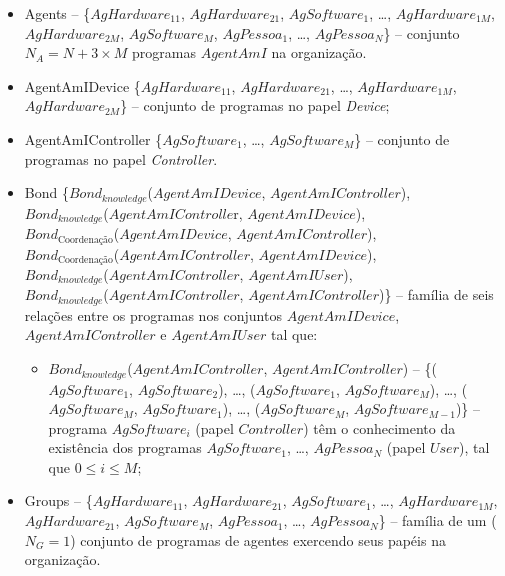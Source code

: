 \begin{itemize}
    \item Agents -- \{$AgHardware_{11}$, $AgHardware_{21}$, $AgSoftware_1$, \ldots, $AgHardware_{1M}$, $AgHardware_{2M}$, $AgSoftware_M$, $AgPessoa_1$, \ldots, $AgPessoa_N$\} – conjunto $N_A = N + 3 \times M$ programas $AgentAmI$ na organização.
    
    \item AgentAmIDevice	\{$AgHardware_{11}$, $AgHardware_{21}$,  \ldots, $AgHardware_{1M}$, $AgHardware_{2M}$\} – conjunto de programas no papel \textit{Device};
    
    \item AgentAmIController	\{$AgSoftware_1$, \ldots, $AgSoftware_M$\} – conjunto de programas no papel \textit{Controller}.
    
    \item Bond	\{$Bond_{knowledge}$($AgentAmIDevice$, $AgentAmIController$),\\
            $Bond_{knowledge}$($AgentAmIControlle$r, $AgentAmIDevice$),\\
            $Bond_{\textrm{Coordenação}}$($AgentAmIDevice$, $AgentAmIController$),\\
            $Bond_{\textrm{Coordenação}}$($AgentAmIController$, $AgentAmIDevice$),\\
            $Bond_{knowledge}$($AgentAmIController$, $AgentAmIUser$),\\
            $Bond_{knowledge}$($AgentAmIController$, $AgentAmIController$)\} – família de seis relações entre os programas nos conjuntos $AgentAmIDevice$, $AgentAmIController$ e $AgentAmIUser$ tal que:
    
    \begin{itemize}
        \item $Bond_{knowledge}$($AgentAmIController$, $AgentAmIController$) --	\{($AgSoftware_1$, $AgSoftware_2$), \ldots , ($AgSoftware_1$, $AgSoftware_M$), \ldots, ($AgSoftware_M$, $AgSoftware_1$), \ldots, ($AgSoftware_M$, $AgSoftware_{M-1}$)\} – programa $AgSoftware_i$ (papel $Controller$) têm o conhecimento da existência dos programas $AgSoftware_1$, \ldots, $AgPessoa_N$ (papel $User$), tal que $0 \leq i \leq M$;
    \end{itemize}
    
    \item Groups -- \{$AgHardware_{11}$, $AgHardware_{21}$, $AgSoftware_1$, \ldots, $AgHardware_{1M}$, $AgHardware_{21}$, $AgSoftware_M$, $AgPessoa_1$, \ldots, $AgPessoa_N$\} – família de um ($N_G = 1$) conjunto de programas de agentes exercendo seus papéis na organização.
    
\end{itemize}

